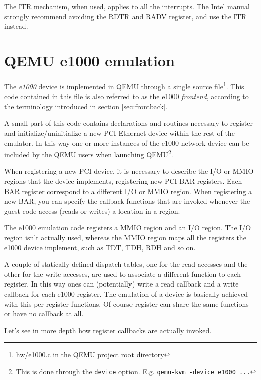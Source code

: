 \vspace{0.5cm}

The ITR mechanism, when used, applies to all the interrupts. The Intel manual strongly recommend avoiding the RDTR and RADV register,
and use the ITR instead.



\section{QEMU e1000 emulation}
\label{sec:e1000emu}
The \emph{e1000} device is implemented in QEMU through a single source file\footnote{hw/e1000.c in the QEMU project root directory}.
This code contained in this file is also referred to as the e1000 \emph{frontend}, according to the terminology introduced in section
\ref{sec:frontback}.

A small part of this code contains declarations and routines necessary to register and initialize/uninitialize a new PCI Ethernet 
device within the rest of the emulator. In this way one or more instances of the e1000 network device can be included by the QEMU users
when launching QEMU\footnote{This is done through the \texttt{device} option. E.g. \texttt{qemu-kvm -device e1000 ...} }.

When registering a new PCI device, it is necessary to describe the I/O or MMIO regions that the device implements, registering new
PCI BAR registers. Each BAR register correspond to a different I/O or MMIO region.
When registering a new BAR, you can specify the callback functions that are invoked whenever the guest code access (reads or writes)
a location in a region.

The e1000 emulation code registers a MMIO region and an I/O region. The I/O region isn't actually used, whereas
the MMIO region maps all the registers the e1000 device implement, such as TDT, TDH, RDH and so on.

A couple of statically defined dispatch tables, one for the read accesses and the other for the write accesses, are used to associate a
different function to each register.
In this way ones can (potentially) write a read callback and a write callback for each e1000 register.
The emulation of a device is basically achieved with this per-register functions. Of course register can share the same functions or have
no callback at all.

\vspace{0.5cm}
Let's see in more depth how register callbacks are actually invoked.

